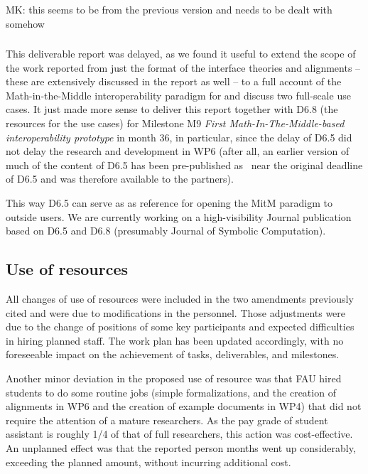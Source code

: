 \begin{oldpart}{MK: this seems to be from the previous version and needs to be dealt with somehow}
\subsubsection{\protect{}}
This deliverable report was delayed, as we found it useful to extend the scope of the work
reported from just the format of the interface theories and alignments -- these are
extensively discussed in the report as well -- to a full account of the Math-in-the-Middle
interoperability paradigm for \pn and discuss two full-scale use cases. It just made more
sense to deliver this report together with D6.8 (the resources for the use cases) for
Milestone M9 \emph{First Math-In-The-Middle-based interoperability prototype} in month 36,
in particular, since the delay of D6.5 did not delay the research and development in WP6
(after all, an earlier version of much of the content of D6.5 has been pre-published
as~\cite{WieKohRab:vtuimkb17,KohMuePfe:kbimss17} near the original deadline of D6.5 and
was therefore available to the \pn partners). 

This way D6.5 can serve as as reference for opening the MitM paradigm to outside users. We
are currently working on a high-visibility Journal publication based on D6.5 and D6.8
(presumably Journal of Symbolic Computation). 

\subsection{Use of resources}

All changes of use of resources were included in the two amendments previously cited and were
due to modifications in the personnel. Those adjustments were due to the change of positions
of some key \ODK participants and expected difficulties in hiring planned
staff. The work plan has been updated accordingly, with no foreseeable
impact on the achievement of tasks, deliverables, and milestones.

Another minor deviation in the proposed use of resource was that FAU hired students to do
some routine jobs (simple formalizations, and the creation of alignments in WP6 and the
creation of example documents in WP4) that did not require the attention of a mature
researchers. As the pay grade of student assistant is roughly 1/4 of that of full
researchers, this action was cost-effective. An unplanned effect was that the reported
person months went up considerably, exceeding the planned amount, without incurring
additional cost. 


\end{oldpart}
